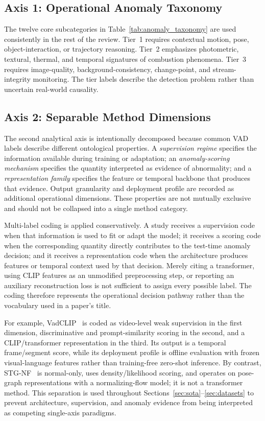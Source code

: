 \documentclass[10pt,a4paper]{article}
\begin{document}
\subsection{Axis 1: Operational Anomaly Taxonomy}
\label{subsec:axis1}
The twelve core subcategories in Table~\ref{tab:anomaly_taxonomy} are used consistently in the rest of the review. Tier~1 requires contextual motion, pose, object-interaction, or trajectory reasoning. Tier~2 emphasizes photometric, textural, thermal, and temporal signatures of combustion phenomena. Tier~3 requires image-quality, background-consistency, change-point, and stream-integrity monitoring. The tier labels describe the detection problem rather than uncertain real-world causality.

\subsection{Axis 2: Separable Method Dimensions}
\label{subsec:axis2}
The second analytical axis is intentionally decomposed because common VAD labels describe different ontological properties. A \emph{supervision regime} specifies the information available during training or adaptation; an \emph{anomaly-scoring mechanism} specifies the quantity interpreted as evidence of abnormality; and a \emph{representation family} specifies the feature or temporal backbone that produces that evidence. Output granularity and deployment profile are recorded as additional operational dimensions. These properties are not mutually exclusive and should not be collapsed into a single method category.

Multi-label coding is applied conservatively. A study receives a supervision code when that information is used to fit or adapt the model; it receives a scoring code when the corresponding quantity directly contributes to the test-time anomaly decision; and it receives a representation code when the architecture produces features or temporal context used by that decision. Merely citing a transformer, using CLIP features as an unmodified preprocessing step, or reporting an auxiliary reconstruction loss is not sufficient to assign every possible label. The coding therefore represents the operational decision pathway rather than the vocabulary used in a paper's title.

For example, VadCLIP~\citep{wu2024vadclip} is coded as video-level weak supervision in the first dimension, discriminative and prompt-similarity scoring in the second, and a CLIP/transformer representation in the third. Its output is a temporal frame/segment score, while its deployment profile is offline evaluation with frozen visual-language features rather than training-free zero-shot inference. By contrast, STG-NF~\citep{hirschorn2023normalizing} is normal-only, uses density/likelihood scoring, and operates on pose-graph representations with a normalizing-flow model; it is not a transformer method. This separation is used throughout Sections~\ref{sec:sota}--\ref{sec:datasets} to prevent architecture, supervision, and anomaly evidence from being interpreted as competing single-axis paradigms.
\end{document}
